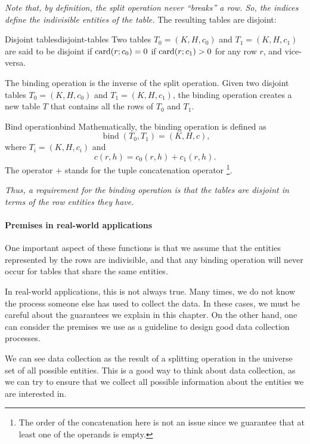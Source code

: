 \emph{Note that, by definition, the split operation never ``breaks'' a row.  So, the
indices define the indivisible entities of the table.}  The resulting tables are
disjoint:

\begin{defbox}{Disjoint tables}{disjoint-tables}
  Two tables $T_0 = (K, H, c_0)$ and $T_1 = (K, H, c_1)$ are said to be disjoint if
  $\rowcard[r; c_0] = 0$ if $\rowcard[r; c_1] > 0$ for any row $r$, and vice-versa.
\end{defbox}

The binding operation is the inverse of the split operation.  Given two disjoint tables
$T_0 = (K, H, c_0)$ and $T_1 = (K, H, c_1)$, the binding operation creates a new table $T$
that contains all the rows of $T_0$ and $T_1$.

\begin{defbox}{Bind operation}{bind}
  Mathematically, the binding operation is defined as \[
    \operatorname{bind}(T_0, T_1) = (K, H, c)\text{,}
  \] where $T_i = (K, H, c_i)$ and \[ c(r, h) = c_0(r, h) + c_1(r, h)\text{.} \]
  The operator $+$ stands for the tuple concatenation operator%
  \footnote{The order of the concatenation here is not an issue since we guarantee
  that at least one of the operands is empty.}.
\end{defbox}

\emph{Thus, a requirement for the binding operation is that the tables are disjoint in
terms of the row entities they have.}

\paragraph{Premises in real-world applications}

One important aspect of these functions is that we assume that the entities represented by
the rows are indivisible, and that any binding operation will never occur for tables that
share the same entities.

In real-world applications, this is not always true.  Many times, we do not know the
process someone else has used to collect the data.  In these cases, we must be careful
about the guarantees we explain in this chapter.  On the other hand, one can consider the
premises we use as a guideline to design good data collection processes.

We can see data collection as the result of a splitting operation in the universe set of
all possible entities.  This is a good way to think about data collection, as we can try
to ensure that we collect all possible information about the entities we are interested
in.

